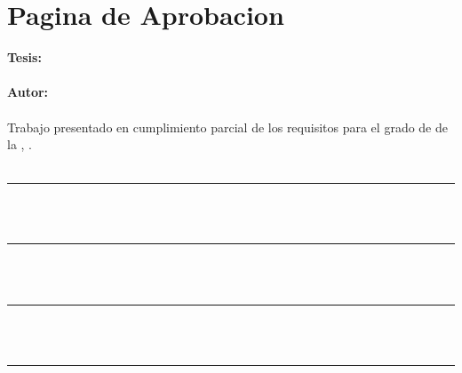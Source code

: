 \chapter*{Pagina de Aprobacion}
\thispagestyle{empty}

\noindent\textbf{Tesis:} \\[0.1cm]
\ThesisTitle \\[0.7cm]

\noindent\textbf{Autor:} \\[0.1cm]
\ThesisAuthor \\[0.7cm]

\noindent Trabajo presentado en cumplimiento parcial de los requisitos para el grado de
\ThesisDegree\space de la \ThesisInstitution, \ThesisCity. \\[1.0cm]

\noindent \ThesisDirector \\[-0.05cm]
\ThesisDirectorName \hfill \rule{7.5cm}{0.1mm} \\[0.8cm]

\noindent \ThesisCoDirector \\[-0.05cm]
\ThesisCoDirectorName \hfill \rule{7.5cm}{0.1mm} \\[0.8cm]

\noindent \ThesisInternalExaminer \\[-0.05cm]
\ThesisInternalExaminerName \hfill \rule{7.5cm}{0.1mm} \\[0.8cm]

\noindent \ThesisExternalExaminer \\[-0.05cm]
\ThesisExternalExaminerName \hfill \rule{7.5cm}{0.1mm}

\clearpage
